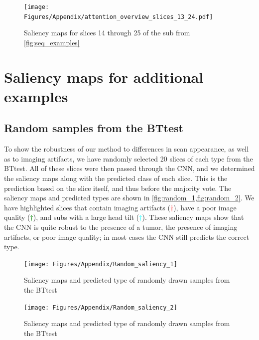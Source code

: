\begin{subappendices}
\begin{figure}[ht]
\texttt{[image: Figures/Appendix/attention\_overview\_slices\_13\_24.pdf]}
\caption{Saliency maps for \glspl{slice} \num{14} through \num{25} of the \gls{sub} from \cref{fig:seq_examples}}\label{fig:saliency_upper_slices}
\end{figure}


\clearpage

\section{Saliency maps for additional examples}\label{app:artifactsaliency}

\subsection{Random samples from the \gls{BTtest}}\label{app:randomtumorsample}

To show the robustness of our method to differences in \gls{scan} appearance, as well as to imaging artifacts, we have randomly selected \num{20} \glspl{slice} of each \gls{type} from the \gls{BTtest}.
All of these \glspl{slice} were then passed through the \gls{CNN}, and we determined the saliency maps along with the predicted \gls{class} of each \gls{slice}.
This is the prediction based on the \gls{slice} itself, and thus before the majority vote.
The saliency maps and predicted \glspl{type} are shown in \cref{fig:random_1,fig:random_2}.
We have highlighted \glspl{slice} that contain imaging artifacts (\textcolor{red}{$\dagger$}), have a poor image quality (\textcolor{green}{$\dagger$}), and \glspl{sub} with a large head tilt  (\textcolor{cyan}{$\dagger$}).
These saliency maps show that the \gls{CNN} is quite robust to the presence of a \gls{tumor}, the presence of imaging artifacts, or poor image quality; in most cases the \gls{CNN} still predicts the correct \gls{type}.


\begin{figure}[ht]
    \centering
    \texttt{[image: Figures/Appendix/Random\_saliency\_1]}

    \caption{Saliency maps and predicted \gls{type} of randomly drawn \glspl{sample} from the \gls{BTtest}}\label{fig:random_1}
\end{figure}

\begin{figure}[ht]
    \centering
    \texttt{[image: Figures/Appendix/Random\_saliency\_2]}

    \caption{Saliency maps and predicted \gls{type} of randomly drawn \glspl{sample} from the \gls{BTtest}}\label{fig:random_2}
\end{figure}



\end{subappendices}
